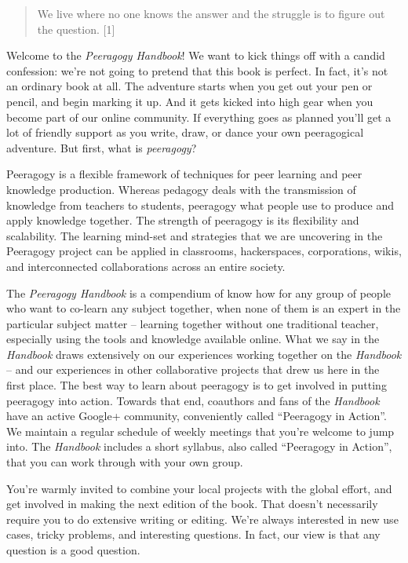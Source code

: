 \begin{quote}
We live where no one knows the answer and the struggle is to figure out
the question. {[}1{]}
\end{quote}

Welcome to the \emph{Peeragogy Handbook}! We want to kick things off
with a candid confession: we're not going to pretend that this book is
perfect. In fact, it's not an ordinary book at all. The adventure starts
when you get out your pen or pencil, and begin marking it up. And it
gets kicked into high gear when you become part of our online community.
If everything goes as planned you'll get a lot of friendly support as
you write, draw, or dance your own peeragogical adventure. But first,
what is \emph{peeragogy}?

Peeragogy is a flexible framework of techniques for peer learning and
peer knowledge production. Whereas pedagogy deals with the transmission
of knowledge from teachers to students, peeragogy what people use to
produce and apply knowledge together. The strength of peeragogy is its
flexibility and scalability. The learning mind-set and strategies that
we are uncovering in the Peeragogy project can be applied in classrooms,
hackerspaces, corporations, wikis, and interconnected collaborations
across an entire society.

The \emph{Peeragogy Handbook} is a compendium of know how for any group
of people who want to co-learn any subject together, when none of them
is an expert in the particular subject matter -- learning together
without one traditional teacher, especially using the tools and
knowledge available online. What we say in the \emph{Handbook} draws
extensively on our experiences working together on the \emph{Handbook}
-- and our experiences in other collaborative projects that drew us here
in the first place. The best way to learn about peeragogy is to get
involved in putting peeragogy into action. Towards that end, coauthors
and fans of the \emph{Handbook} have an active Google+ community,
conveniently called ``Peeragogy in Action''. We maintain a regular
schedule of weekly meetings that you're welcome to jump into. The
\emph{Handbook} includes a short syllabus, also called ``Peeragogy in
Action'', that you can work through with your own group.

You're warmly invited to combine your local projects with the global
effort, and get involved in making the next edition of the book. That
doesn't necessarily require you to do extensive writing or editing.
We're always interested in new use cases, tricky problems, and
interesting questions. In fact, our view is that any question is a good
question.

